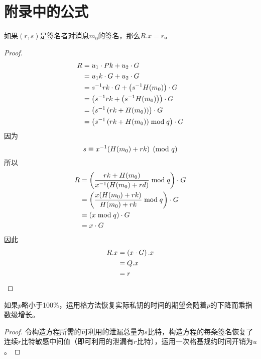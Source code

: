 \thispagestyle{appendixheader}
\setcounter{app_fig}{1}
\setcounter{app_tab}{1}
\setcounter{equation}{0}
\renewcommand\theequation{附\arabic{app}-\arabic{equation}}
\renewcommand\chaptername{附录}
\renewcommand\chaptername{Appendix} 
\renewcommand\thechapter{附录\zhnum{app}} 

\setcounter{chapter}{0}
\setcounter{section}{0}
\chapter{附录中的公式}\label{chap:app1}{
	\setcounter{app_fig}{1}
	\begin{proposition}\label{prop:ECDSA-authentication}
		如果$(r,s)$是签名者对消息$m_0$的签名，那么$R.x=r$。 
	\end{proposition}
	\begin{proof}
		\begin{align*}
			R&=u_1\cdot Pk+u_2\cdot G \\
			&= u_1k\cdot G+u_2\cdot G \\
			&= s^{-1}rk\cdot G+\left(s^{-1}H(m_0)\right)\cdot G \\
			&= \left(s^{-1}rk+\left(s^{-1}H(m_0)\right)\right)\cdot G \\
			&= \left(s^{-1}\left(rk+H(m_0)\right)\right)\cdot G \\
			&= \left(s^{-1}\left(rk+H(m_0)\right)\bmod q\right)\cdot G
		\end{align*}
		因为$$s\equiv x^{-1}(H(m_0)+rk) \pmod q$$
		所以\begin{align*}
			R&= \left(\frac{rk+H(m_0)}{x^{-1}(H(m_0)+rd)}\bmod q\right)\cdot G \\
			&= \left(\frac{x(H(m_0)+rk)}{H(m_0)+rk}\bmod q\right)\cdot G \\
			&= \left(x\bmod q\right)\cdot G \\
			&= x\cdot G
		\end{align*}
		因此\begin{align*}
			R.x&=\left(x\cdot G\right).x\\
			&=Q.x\\
			&=r
		\end{align*}
	\end{proof}
		
	\begin{proposition}\label{prop:expotime}
		如果\zyx$p$略小于100\%，运用格方法恢复实际私钥的时间的期望会随着\zyx$p$的下降而乘指数级增长。
	\end{proposition}
	\begin{proof}
		令构造方程所需的可利用的泄漏总量为$s$比特，构造方程的每条签名恢复了连续$r$比特敏感中间值（即可利用的泄漏有$r$比特），运用一次格基规约时间开销为$u$。
		

\end{proof}}
